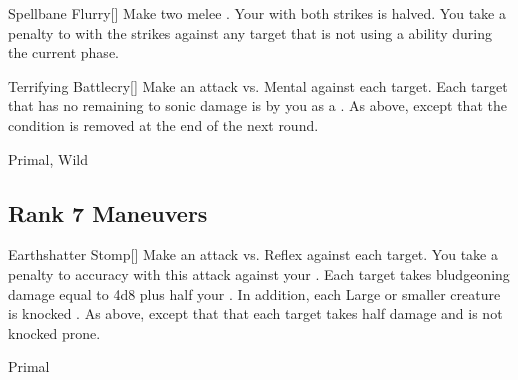 \lowercase{\hypertarget{maneuver:Spellbane Flurry}{}}\label{maneuver:Spellbane Flurry}
\hypertarget{maneuver:Spellbane Flurry}{}
\begin{freeability}[Rank 6]{Spellbane Flurry}[]
Make two melee .
Your  with both strikes is halved.
You take a  penalty to  with the strikes against any target that is not using a  ability during the current phase.


\end{freeability}
\vspace{0.25em}



\lowercase{\hypertarget{maneuver:Terrifying Battlecry}{}}\label{maneuver:Terrifying Battlecry}
\hypertarget{maneuver:Terrifying Battlecry}{}
\begin{freeability}[Rank 6]{Terrifying Battlecry}[]
Make an attack vs. Mental against each target.
\hit Each target that has no remaining  to sonic damage is  by you as a .
\glance As above, except that the condition is removed at the end of the next round.


 Primal, Wild
\end{freeability}
\vspace{0.25em}


\subsection{Rank 7 Maneuvers}

\lowercase{\hypertarget{maneuver:Earthshatter Stomp}{}}\label{maneuver:Earthshatter Stomp}
\hypertarget{maneuver:Earthshatter Stomp}{}
\begin{freeability}[Rank 7]{Earthshatter Stomp}[]
Make an attack vs. Reflex against each target.
You take a  penalty to accuracy with this attack against your .
\hit Each target takes bludgeoning damage equal to 4d8 plus half your .
In addition, each Large or smaller creature is knocked .
\glance As above, except that that each target takes half damage and is not knocked prone.


 Primal
\end{freeability}
\vspace{0.25em}



